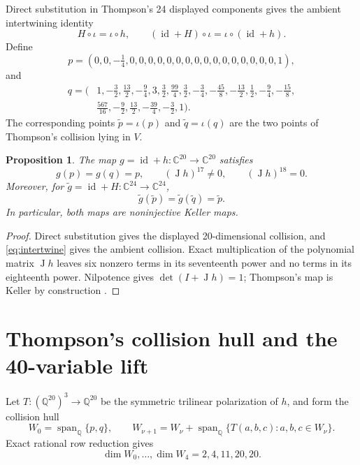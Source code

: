 \documentclass[11pt]{article}
\newtheorem{proposition}[theorem]{Proposition}
\theoremstyle{remark}
\DeclareMathOperator{\J}{J}
\newcommand{\Q}{\mathbb{Q}}
\newcommand{\C}{\mathbb{C}}
\newcommand{\id}{\operatorname{id}}
\begin{document}
Direct substitution in Thompson's 24 displayed components gives the ambient intertwining identity
\begin{equation}\label{eq:intertwine}
H\circ\iota=\iota\circ h,\qquad
(\id+H)\circ\iota=\iota\circ(\id+h).
\end{equation}
Define
\begin{equation}\label{eq:p}
p=(0,0,-\tfrac14,0,0,0,0,0,0,0,0,0,0,0,0,0,0,0,0,1),
\end{equation}
and
\begin{equation}\label{eq:q}
\begin{split}
q=(&1,-\tfrac32,\tfrac{13}{2},-\tfrac94,3,\tfrac32,\tfrac{99}{4},\tfrac32,-\tfrac34,-\tfrac{45}{8},-\tfrac{13}{2},\tfrac12,-\tfrac94,-\tfrac{15}{8},\\
&\tfrac{567}{16},-\tfrac92,\tfrac{13}{2},-\tfrac{39}{4},-\tfrac32,1).
\end{split}
\end{equation}
The corresponding points $\widetilde p=\iota(p)$ and $\widetilde q=\iota(q)$ are the two points of Thompson's collision lying in $V$.

\begin{proposition}\label{prop:twenty-map}
The map $g=\id+h\colon\C^{20}\to\C^{20}$ satisfies
\[
g(p)=g(q)=p,\qquad (\J h)^{17}\ne0,\qquad(\J h)^{18}=0.
\]
Moreover, for $\widetilde g=\id+H\colon\C^{24}\to\C^{24}$,
\[
\widetilde g(\widetilde p)=\widetilde g(\widetilde q)=\widetilde p.
\]
In particular, both maps are noninjective Keller maps.
\end{proposition}

\begin{proof}
Direct substitution gives the displayed 20-dimensional collision, and \eqref{eq:intertwine} gives the ambient collision. Exact multiplication of the polynomial matrix $\J h$ leaves six nonzero terms in its seventeenth power and no terms in its eighteenth power. Nilpotence gives $\det(I+\J h)=1$; Thompson's map is Keller by construction \citep{Thompson2026}.
\end{proof}

\section{Thompson's collision hull and the 40-variable lift}\label{sec:forty}

Let $T\colon(\Q^{20})^3\to\Q^{20}$ be the symmetric trilinear polarization of $h$, and form the collision hull
\[
W_0=\operatorname{span}_{\Q}\{p,q\},\qquad
W_{\nu+1}=W_\nu+\operatorname{span}_{\Q}\{T(a,b,c):a,b,c\in W_\nu\}.
\]
Exact rational row reduction gives
\begin{equation}\label{eq:growth20}
\dim W_0,\ldots,\dim W_4=2,4,11,20,20.
\end{equation}
\end{document}
